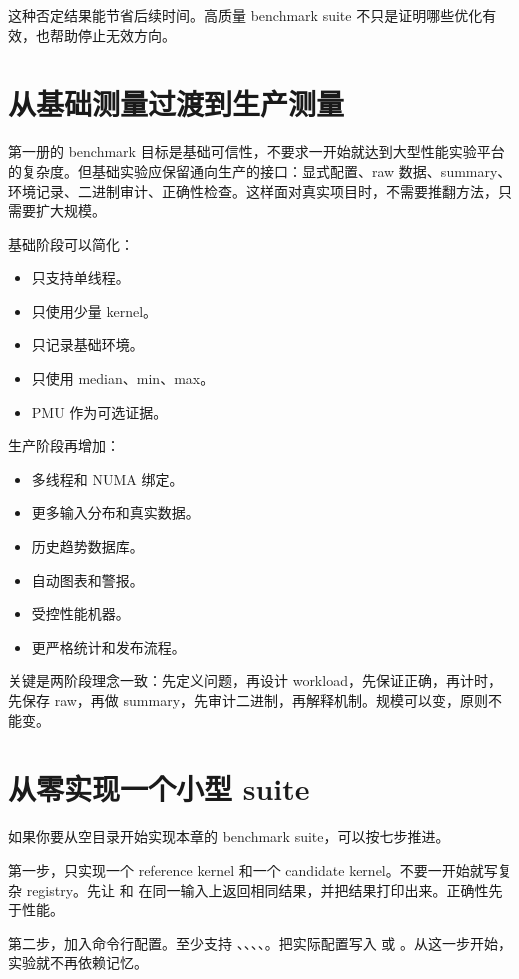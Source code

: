这种否定结果能节省后续时间。高质量 benchmark suite 不只是证明哪些优化有效，也帮助停止无效方向。

\section{从基础测量过渡到生产测量}

第一册的 benchmark 目标是基础可信性，不要求一开始就达到大型性能实验平台的复杂度。但基础实验应保留通向生产的接口：显式配置、raw 数据、summary、环境记录、二进制审计、正确性检查。这样面对真实项目时，不需要推翻方法，只需要扩大规模。

基础阶段可以简化：

\begin{itemize}
  \item 只支持单线程。
  \item 只使用少量 kernel。
  \item 只记录基础环境。
  \item 只使用 median、min、max。
  \item PMU 作为可选证据。
\end{itemize}

生产阶段再增加：

\begin{itemize}
  \item 多线程和 NUMA 绑定。
  \item 更多输入分布和真实数据。
  \item 历史趋势数据库。
  \item 自动图表和警报。
  \item 受控性能机器。
  \item 更严格统计和发布流程。
\end{itemize}

关键是两阶段理念一致：先定义问题，再设计 workload，先保证正确，再计时，先保存 raw，再做 summary，先审计二进制，再解释机制。规模可以变，原则不能变。

\section{从零实现一个小型 suite}

如果你要从空目录开始实现本章的 benchmark suite，可以按七步推进。

第一步，只实现一个 reference kernel 和一个 candidate kernel。不要一开始就写复杂 registry。先让  和  在同一输入上返回相同结果，并把结果打印出来。正确性先于性能。

第二步，加入命令行配置。至少支持 、、、、。把实际配置写入  或 。从这一步开始，实验就不再依赖记忆。

